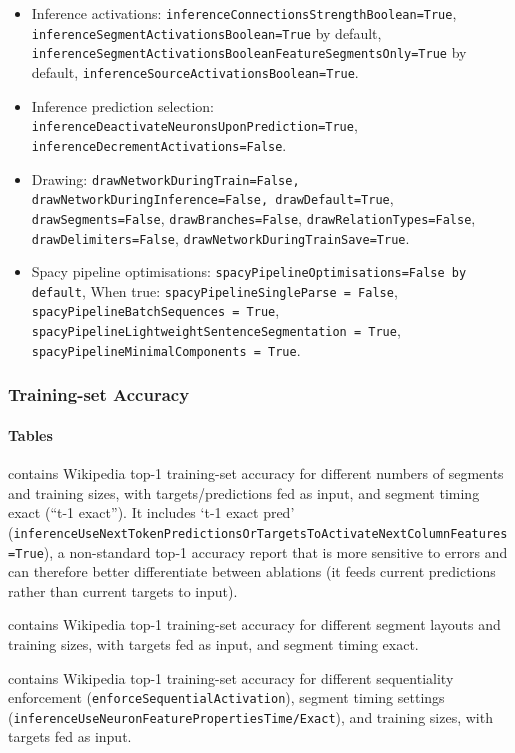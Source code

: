 \begin{itemize}
	\item Inference activations: \texttt{inferenceConnectionsStrengthBoolean=True}, \texttt{inferenceSegmentActivationsBoolean=True} by default, \texttt{inferenceSegmentActivationsBooleanFeatureSegmentsOnly=True} by default, \texttt{inferenceSourceActivationsBoolean=True}.
	\item Inference prediction selection: \texttt{inferenceDeactivateNeuronsUponPrediction=True}, \texttt{inferenceDecrementActivations=False}.
	\item Drawing: \texttt{drawNetworkDuringTrain=False, drawNetworkDuringInference=False, drawDefault=True}, \texttt{drawSegments=False}, \texttt{drawBranches=False}, \texttt{drawRelationTypes=False}, \texttt{drawDelimiters=False}, \texttt{drawNetworkDuringTrainSave=True}.
	\item Spacy pipeline optimisations: \texttt{spacyPipelineOptimisations=False by default}, When true: \texttt{spacyPipelineSingleParse = False}, \texttt{spacyPipelineBatchSequences = True}, \texttt{spacyPipelineLightweightSentenceSegmentation = True}, \texttt{spacyPipelineMinimalComponents = True}.
\end{itemize}

\subsubsection{Training-set Accuracy}

\paragraph{Tables}

 contains Wikipedia top-1 training-set accuracy for different numbers of segments and training sizes, with targets/predictions fed as input, and segment timing exact (``t-1 exact''). It includes `t-1 exact pred' (\texttt{inferenceUseNextTokenPredictionsOrTargetsToActivateNextColumnFeatures=True}), a non-standard top-1 accuracy report that is more sensitive to errors and can therefore better differentiate between ablations (it feeds current predictions rather than current targets to input).

 contains Wikipedia top-1 training-set accuracy for different segment layouts and training sizes, with targets fed as input, and segment timing exact.

 contains Wikipedia top-1 training-set accuracy for different sequentiality enforcement (\texttt{enforceSequentialActivation}), segment timing settings (\texttt{inferenceUseNeuronFeaturePropertiesTime/Exact}), and training sizes, with targets fed as input.

